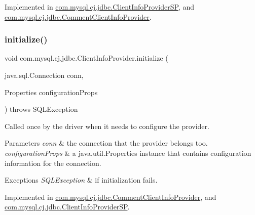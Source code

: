 Implemented in \mbox{\hyperlink{classcom_1_1mysql_1_1cj_1_1jdbc_1_1_client_info_provider_s_p_a64004310beae80de1724f7523a5d6337}{com.\+mysql.\+cj.\+jdbc.\+Client\+Info\+Provider\+SP}}, and \mbox{\hyperlink{classcom_1_1mysql_1_1cj_1_1jdbc_1_1_comment_client_info_provider_a6f82ab824da3031d66cf52b027077f9a}{com.\+mysql.\+cj.\+jdbc.\+Comment\+Client\+Info\+Provider}}.

\mbox{\label{interfacecom_1_1mysql_1_1cj_1_1jdbc_1_1_client_info_provider_aacf1104fd90e2c5b1ca940d63e884cf6}} 
\subsubsection{\texorpdfstring{initialize()}{initialize()}}
{\footnotesize\ttfamily void com.\+mysql.\+cj.\+jdbc.\+Client\+Info\+Provider.\+initialize (\begin{DoxyParamCaption}\item[{java.\+sql.\+Connection}]{conn,  }\item[{Properties}]{configuration\+Props }\end{DoxyParamCaption}) throws S\+Q\+L\+Exception}

Called once by the driver when it needs to configure the provider.


\begin{DoxyParams}{Parameters}
{\em conn} & the connection that the provider belongs too. \\
\hline
{\em configuration\+Props} & a java.\+util.\+Properties instance that contains configuration information for the connection. \\
\hline
\end{DoxyParams}

\begin{DoxyExceptions}{Exceptions}
{\em S\+Q\+L\+Exception} & if initialization fails. \\
\hline
\end{DoxyExceptions}


Implemented in \mbox{\hyperlink{classcom_1_1mysql_1_1cj_1_1jdbc_1_1_comment_client_info_provider_a97c8c3819905e4745f248350c01dd479}{com.\+mysql.\+cj.\+jdbc.\+Comment\+Client\+Info\+Provider}}, and \mbox{\hyperlink{classcom_1_1mysql_1_1cj_1_1jdbc_1_1_client_info_provider_s_p_a39331800ea481417eab7170b3a878af5}{com.\+mysql.\+cj.\+jdbc.\+Client\+Info\+Provider\+SP}}.

